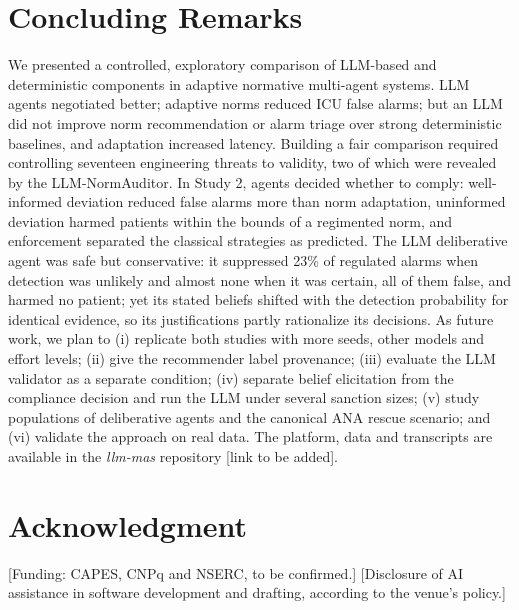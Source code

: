 \documentclass{ieeeaccess}
\begin{document}
\section{Concluding Remarks}\label{sec:8}
We presented a controlled, exploratory comparison of LLM-based and deterministic components in adaptive normative multi-agent systems. LLM agents negotiated better; adaptive norms reduced ICU false alarms; but an LLM did not improve norm recommendation or alarm triage over strong deterministic baselines, and adaptation increased latency. Building a fair comparison required controlling seventeen engineering threats to validity, two of which were revealed by the LLM-NormAuditor. In Study 2, agents decided whether to comply: well-informed deviation reduced false alarms more than norm adaptation, uninformed deviation harmed patients within the bounds of a regimented norm, and enforcement separated the classical strategies as predicted. The LLM deliberative agent was safe but conservative: it suppressed 23\% of regulated alarms when detection was unlikely and almost none when it was certain, all of them false, and harmed no patient; yet its stated beliefs shifted with the detection probability for identical evidence, so its justifications partly rationalize its decisions. As future work, we plan to (i) replicate both studies with more seeds, other models and effort levels; (ii) give the recommender label provenance; (iii) evaluate the LLM validator as a separate condition; (iv) separate belief elicitation from the compliance decision and run the LLM under several sanction sizes; (v) study populations of deliberative agents and the canonical ANA rescue scenario; and (vi) validate the approach on real data. The platform, data and transcripts are available in the \emph{llm-mas} repository [link to be added].

\section*{Acknowledgment}
[Funding: CAPES, CNPq and NSERC, to be confirmed.] [Disclosure of AI assistance in software development and drafting, according to the venue's policy.]







\EOD
\end{document}

